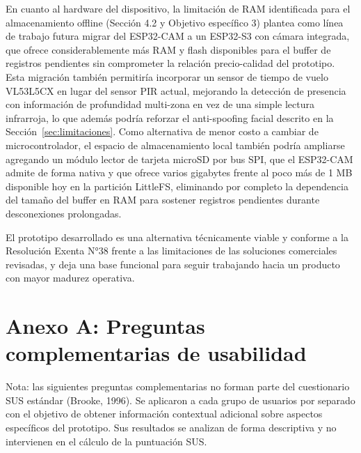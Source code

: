 \documentclass{iccmemoria}
\begin{document}
En cuanto al hardware del dispositivo, la limitación de RAM identificada para el almacenamiento offline (Sección 4.2 y Objetivo específico 3) plantea como línea de trabajo futura migrar del ESP32-CAM a un ESP32-S3 con cámara integrada, que ofrece considerablemente más RAM y flash disponibles para el buffer de registros pendientes sin comprometer la relación precio-calidad del prototipo. Esta migración también permitiría incorporar un sensor de tiempo de vuelo VL53L5CX en lugar del sensor PIR actual, mejorando la detección de presencia con información de profundidad multi-zona en vez de una simple lectura infrarroja, lo que además podría reforzar el anti-spoofing facial descrito en la Sección~\ref{sec:limitaciones}. Como alternativa de menor costo a cambiar de microcontrolador, el espacio de almacenamiento local también podría ampliarse agregando un módulo lector de tarjeta microSD por bus SPI, que el ESP32-CAM admite de forma nativa y que ofrece varios gigabytes frente al poco más de 1 MB disponible hoy en la partición LittleFS, eliminando por completo la dependencia del tamaño del buffer en RAM para sostener registros pendientes durante desconexiones prolongadas.

El prototipo desarrollado es una alternativa técnicamente viable y conforme a la Resolución Exenta N°38 frente a las limitaciones de las soluciones comerciales revisadas, y deja una base funcional para seguir trabajando hacia un producto con mayor madurez operativa.


\renewcommand{\bibname}{Bibliografía}
\nocite{atlassian_scrum}


\chapter*{Anexo A: Preguntas complementarias de usabilidad}

Nota: las siguientes preguntas complementarias no forman parte del cuestionario SUS estándar (Brooke, 1996). Se aplicaron a cada grupo de usuarios por separado con el objetivo de obtener información contextual adicional sobre aspectos específicos del prototipo. Sus resultados se analizan de forma descriptiva y no intervienen en el cálculo de la puntuación SUS.
\end{document}
